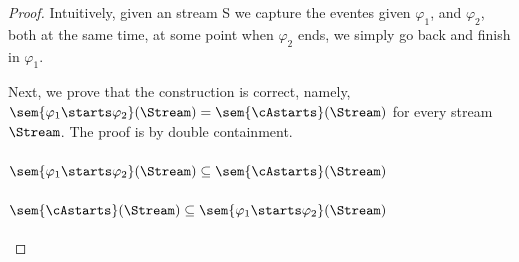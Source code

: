 \begin{proof}
Intuitively, given an stream S we capture the eventes given $\varphi_1$, and $\varphi_2$, both at the same time, at some point when $\varphi_2$ ends, we simply go back and finish in $\varphi_1$.

Next, we prove that the construction is correct, namely, $\sem{\varphi_1 \starts \varphi_2}(\Stream) = \sem{\cAstarts}(\Stream)$ for every stream $\Stream$. The proof is by double containment. 

\paragraph{$\sem{\varphi_1 \starts \varphi_2}(\Stream) \subseteq \sem{\cAstarts}(\Stream)$}

\paragraph{$\sem{\cAstarts}(\Stream) \subseteq \sem{\varphi_1 \starts \varphi_2}(\Stream)$}
\end{proof}

